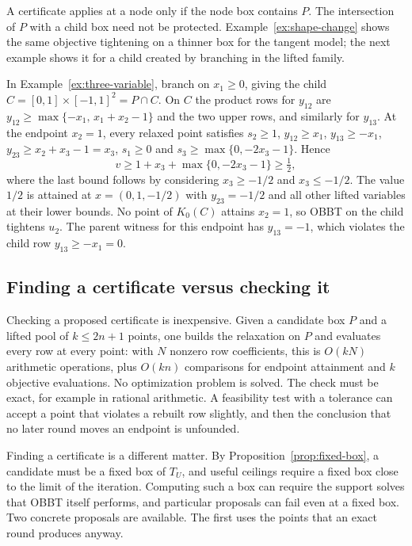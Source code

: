 A certificate applies at a node only if the node box contains $P$. The
intersection of $P$ with a child box need not be protected.
Example~\ref{ex:shape-change} shows the same objective tightening on a
thinner box for the tangent model; the next example shows it for a child
created by branching in the lifted family.

\begin{example}\label{ex:child}
In Example~\ref{ex:three-variable}, branch on $x_1\ge0$, giving the child
$C=[0,1]\times[-1,1]^2=P\cap C$. On $C$ the product rows for $y_{12}$ are
$y_{12}\ge\max\{-x_1,\,x_1+x_2-1\}$ and the two upper rows, and similarly
for $y_{13}$. At the endpoint $x_2=1$, every relaxed point satisfies
$s_2\ge1$, $y_{12}\ge x_1$, $y_{13}\ge-x_1$, $y_{23}\ge x_2+x_3-1=x_3$,
$s_1\ge0$ and $s_3\ge\max\{0,-2x_3-1\}$. Hence
\[
 v\ge1+x_3+\max\{0,-2x_3-1\}\ge\tfrac12,
\]
where the last bound follows by considering $x_3\ge-1/2$ and
$x_3\le-1/2$. The value $1/2$ is attained at $x=(0,1,-1/2)$ with
$y_{23}=-1/2$ and all other lifted variables at their lower bounds. No
point of $K_0(C)$ attains $x_2=1$, so OBBT on the child tightens $u_2$.
The parent witness for this endpoint has $y_{13}=-1$, which violates the
child row $y_{13}\ge-x_1=0$.
\end{example}

\subsection{Finding a certificate versus checking it}\label{sec:cert-cost}

Checking a proposed certificate is inexpensive. Given a candidate box $P$
and a lifted pool of $k\le2n+1$ points, one builds the relaxation on $P$
and evaluates every row at every point: with $N$ nonzero row
coefficients, this is $O(kN)$ arithmetic operations, plus $O(kn)$
comparisons for endpoint attainment and $k$ objective evaluations. No
optimization problem is solved. The check must be exact, for example in
rational arithmetic. A feasibility test with a tolerance can accept a
point that violates a rebuilt row slightly, and then the conclusion that
no later round moves an endpoint is unfounded.

Finding a certificate is a different matter. By
Proposition~\ref{prop:fixed-box}, a candidate must be a fixed box of
$T_U$, and useful ceilings require a fixed box close to the limit of the
iteration. Computing such a box can require the support solves that OBBT
itself performs, and particular proposals can fail even at a fixed box.
Two concrete proposals are available. The first uses the points that an
exact round produces anyway.


